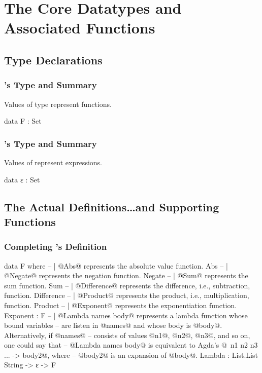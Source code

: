 \documentclass{report}
\begin{document}
\chapter{The Core Datatypes and Associated Functions}

\section{Type Declarations}

\subsection{'s Type and Summary}
Values of type  represent functions.

\begin{code}
data F : Set
\end{code}

\subsection{'s Type and Summary}
Values of  represent expressions.

\begin{code}
data ε : Set
\end{code}

\section{The Actual Definitions\ldots and Supporting Functions}

\subsection{Completing 's Definition}

\begin{code}
data F where
  -- | @Abs@ represents the absolute value function.
  Abs
   -- | @Negate@ represents the negation function.
   Negate
   -- | @Sum@ represents the sum function.
   Sum
   -- | @Difference@ represents the difference, i.e., subtraction, function.
   Difference
   -- | @Product@ represents the product, i.e., multiplication, function.
   Product
   -- | @Exponent@ represents the exponentiation function.
   Exponent : F
  -- | @Lambda names body@ represents a lambda function whose bound variables
  -- are listen in @names@ and whose body is @body@.  Alternatively, if @names@
  -- consists of values @n1@, @n2@, @n3@, and so on, one could say that
  -- @Lambda names body@ is equivalent to Agda's @\ n1 n2 n3 ... -> body2@, where
  -- @body2@ is an expansion of @body@.
  Lambda : List.List String -> ε -> F
\end{code}
\end{document}
